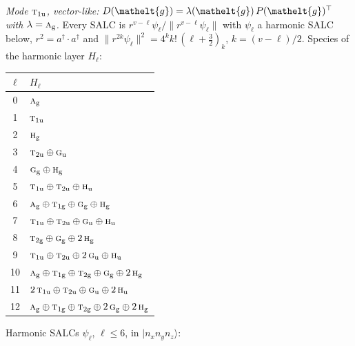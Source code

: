 \documentclass[11pt]{article}
\newcommand{\eltfont}[1]{{\let\sigma\eltsigma\mathelt{#1}}}
\newcommand{\irr}[1]{\text{\normalfont\scshape #1}}
\newcommand{\elt}[1]{\eltfont{#1}}
\newcommand{\ptag}[1]{\mathrm{#1}}
\newcommand{\occ}[1]{\lvert #1\rangle}
\newcommand{\gel}{\elt{g}}             %
\newcommand{\gmat}{P(\gel)^{\top}}     %
\begin{document}
\emph{Mode $\irr{t}_{1\ptag{u}}$, vector-like: $D(\gel)=\lambda(\gel)\,\gmat$ with $\lambda=\irr{a}_{\ptag{g}}$.} Every SALC is $r^{v-\ell}\psi_\ell/\lVert r^{v-\ell}\psi_\ell\rVert$ with $\psi_\ell$ a harmonic SALC below, $r^2=a^\dagger\!\cdot a^\dagger$ and $\lVert r^{2k}\psi_\ell\rVert^2=4^kk!\,(\ell+\tfrac32)_k$, $k=(v-\ell)/2$. Species of the harmonic layer $H_\ell$:
\begin{longtable}{c l}\hline $\ell$ & $H_\ell$\\ \hline\endhead
0 & $\irr{a}_{\ptag{g}}$\\
1 & $\irr{t}_{1\ptag{u}}$\\
2 & $\irr{h}_{\ptag{g}}$\\
3 & $\irr{t}_{2\ptag{u}}\oplus \irr{g}_{\ptag{u}}$\\
4 & $\irr{g}_{\ptag{g}}\oplus \irr{h}_{\ptag{g}}$\\
5 & $\irr{t}_{1\ptag{u}}\oplus \irr{t}_{2\ptag{u}}\oplus \irr{h}_{\ptag{u}}$\\
6 & $\irr{a}_{\ptag{g}}\oplus \irr{t}_{1\ptag{g}}\oplus \irr{g}_{\ptag{g}}\oplus \irr{h}_{\ptag{g}}$\\
7 & $\irr{t}_{1\ptag{u}}\oplus \irr{t}_{2\ptag{u}}\oplus \irr{g}_{\ptag{u}}\oplus \irr{h}_{\ptag{u}}$\\
8 & $\irr{t}_{2\ptag{g}}\oplus \irr{g}_{\ptag{g}}\oplus 2\,\irr{h}_{\ptag{g}}$\\
9 & $\irr{t}_{1\ptag{u}}\oplus \irr{t}_{2\ptag{u}}\oplus 2\,\irr{g}_{\ptag{u}}\oplus \irr{h}_{\ptag{u}}$\\
10 & $\irr{a}_{\ptag{g}}\oplus \irr{t}_{1\ptag{g}}\oplus \irr{t}_{2\ptag{g}}\oplus \irr{g}_{\ptag{g}}\oplus 2\,\irr{h}_{\ptag{g}}$\\
11 & $2\,\irr{t}_{1\ptag{u}}\oplus \irr{t}_{2\ptag{u}}\oplus \irr{g}_{\ptag{u}}\oplus 2\,\irr{h}_{\ptag{u}}$\\
12 & $\irr{a}_{\ptag{g}}\oplus \irr{t}_{1\ptag{g}}\oplus \irr{t}_{2\ptag{g}}\oplus 2\,\irr{g}_{\ptag{g}}\oplus 2\,\irr{h}_{\ptag{g}}$\\
\hline\end{longtable}
Harmonic SALCs $\psi_\ell$, $\ell\le6$, in $\occ{n_xn_yn_z}$:
\end{document}
